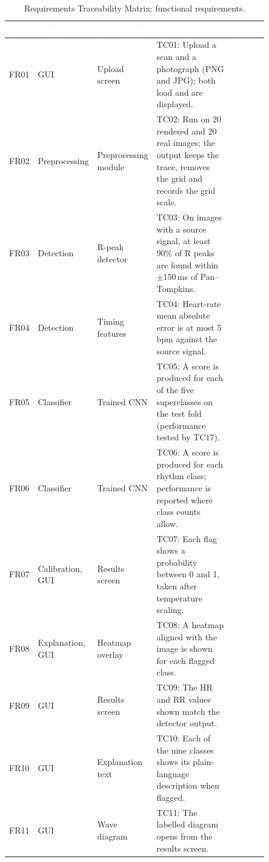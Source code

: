 \begin{table}[H]
  \centering
  \footnotesize
  \setlength{\arrayrulewidth}{0.8pt}
  \renewcommand{\arraystretch}{1.25}
  \caption{Requirements Traceability Matrix: functional requirements.}
  \label{tab:rtm-fr}
  \begin{tabular}{|p{0.07\linewidth}|p{0.15\linewidth}|p{0.16\linewidth}|p{0.39\linewidth}|p{0.08\linewidth}|}
    \hline
    \rowcolor{cyan!90!black}
    \textcolor{white}{\textbf{ID}} & \textcolor{white}{\textbf{Module}} &
    \textcolor{white}{\textbf{Deliverable}} & \textcolor{white}{\textbf{Test case}} &
    \textcolor{white}{\textbf{Result}} \\
    \hline
    FR01 & GUI & Upload screen & TC01: Upload a scan and a photograph (PNG and JPG); both load and are displayed. & \\
    \hline
    FR02 & Preprocessing & Preprocessing module & TC02: Run on 20 rendered and 20 real images; the output keeps the trace, removes the grid and records the grid scale. & \\
    \hline
    FR03 & Detection & R-peak detector & TC03: On images with a source signal, at least 90\% of R peaks are found within $\pm150$\,ms of Pan--Tompkins. & \\
    \hline
    FR04 & Detection & Timing features & TC04: Heart-rate mean absolute error is at most 5\,bpm against the source signal. & \\
    \hline
    FR05 & Classifier & Trained CNN & TC05: A score is produced for each of the five superclasses on the test fold (performance tested by TC17). & \\
    \hline
    FR06 & Classifier & Trained CNN & TC06: A score is produced for each rhythm class; performance is reported where class counts allow. & \\
    \hline
    FR07 & Calibration, GUI & Results screen & TC07: Each flag shows a probability between 0 and 1, taken after temperature scaling. & \\
    \hline
    FR08 & Explanation, GUI & Heatmap overlay & TC08: A heatmap aligned with the image is shown for each flagged class. & \\
    \hline
    FR09 & GUI & Results screen & TC09: The HR and RR values shown match the detector output. & \\
    \hline
    FR10 & GUI & Explanation text & TC10: Each of the nine classes shows its plain-language description when flagged. & \\
    \hline
    FR11 & GUI & Wave diagram & TC11: The labelled diagram opens from the results screen. & \\

\end{tabular}
\end{table}
